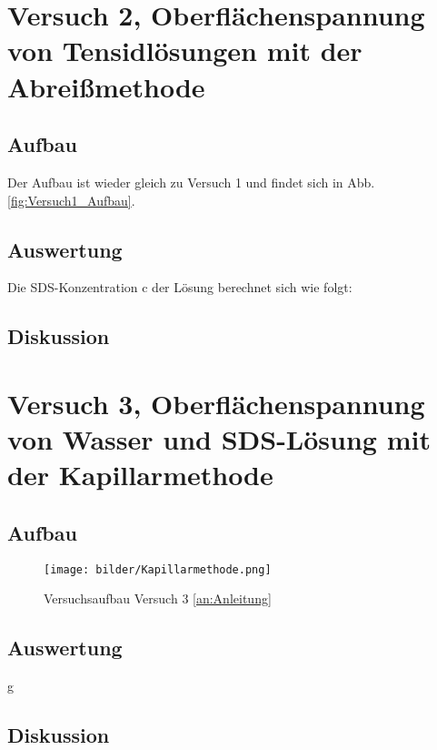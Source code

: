     \section{Versuch 2, Oberflächenspannung von Tensidlösungen mit der Abreißmethode}

        \subsection{Aufbau}
            Der Aufbau ist wieder gleich zu Versuch 1 und findet sich in Abb. \ref{fig:Versuch1_Aufbau}. 

        \subsection{Auswertung}
            Die SDS-Konzentration $\mathrm{c}$ der Lösung berechnet sich wie folgt:

        
        \subsection{Diskussion}

    \section{Versuch 3, Oberflächenspannung von Wasser und SDS-Lösung mit der Kapillarmethode}

        \subsection{Aufbau}

            \begin{figure}[H]
                \centering
                \texttt{[image: bilder/Kapillarmethode.png]}
                \caption{Versuchsaufbau Versuch 3 \ref{an:Anleitung}}
                \label{fig:Versuch3_Aufbau}
            \end{figure}

        \subsection{Auswertung}
        
        g\subsection{Diskussion}
